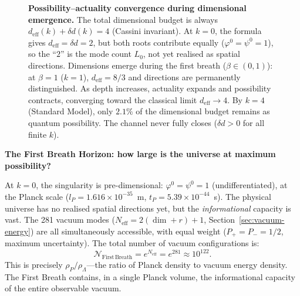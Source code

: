 \documentclass[12pt,a4paper]{article}
\begin{document}
\begin{figure}[ht]
\caption{\textbf{Possibility--actuality convergence during dimensional emergence.}  The total dimensional budget is always $d_{\mathrm{eff}}(k) + \delta d(k) = 4$ (Cassini invariant).  At $k = 0$, the formula gives $d_{\mathrm{eff}} = \delta d = 2$, but both roots contribute equally ($\varphi^0 = \psi^0 = 1$), so the ``$2$'' is the mode count $L_0$, not yet realised as spatial directions.  Dimensions emerge during the first breath ($\beta \in (0,1)$): at $\beta = 1$ ($k = 1$), $d_{\mathrm{eff}} = 8/3$ and directions are permanently distinguished.  As depth increases, actuality expands and possibility contracts, converging toward the classical limit $d_{\mathrm{eff}} \to 4$.  By $k = 4$ (Standard Model), only $2.1\%$ of the dimensional budget remains as quantum possibility.  The channel never fully closes ($\delta d > 0$ for all finite $k$).}
\label{fig:first-breath}
\end{figure}

\noindent\textbf{The First Breath Horizon: how large is the universe at maximum possibility?}

At $k = 0$, the singularity is pre-dimensional: $\varphi^0 = \psi^0 = 1$ (undifferentiated), at the Planck scale ($l_P = 1.616 \times 10^{-35}$~m, $t_P = 5.39 \times 10^{-44}$~s).  The physical universe has no realised spatial directions yet, but the \emph{informational} capacity is vast.  The 281 vacuum modes ($N_{\mathrm{eff}} = 2(\dim + r) + 1$, Section~\ref{sec:vacuum-energy}) are all simultaneously accessible, with equal weight ($P_+ = P_- = 1/2$, maximum uncertainty).  The total number of vacuum configurations is:
\begin{equation}
\mathcal{N}_{\mathrm{First\,Breath}} = e^{N_{\mathrm{eff}}} = e^{281} \approx 10^{122}.
\label{eq:first-breath-configs}
\end{equation}
This is precisely $\rho_P / \rho_\Lambda$---the ratio of Planck density to vacuum energy density.  The First Breath contains, in a single Planck volume, the informational capacity of the entire observable vacuum.
\end{document}
